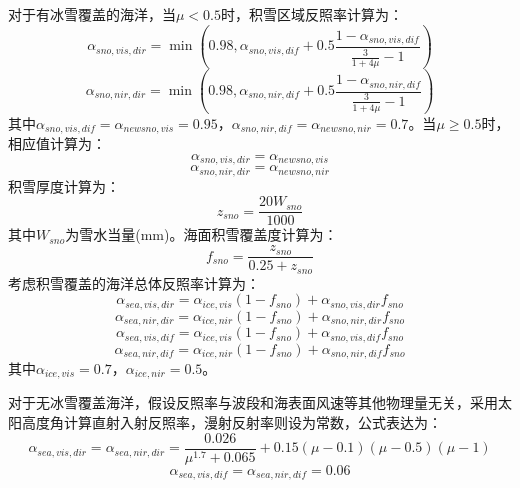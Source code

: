 对于有冰雪覆盖的海洋，当\(\mu < 0.5\)时，积雪区域反照率计算为：
%
\begin{equation}
\alpha_{sno,vis,dir} = \min\left( 0.98,\alpha_{sno,vis,dif} + 0.5\frac{1 - \alpha_{sno,vis,dif}}{\frac{3}{1 + 4\mu} - 1} \right)
\end{equation}
%
\begin{equation}
\alpha_{sno,nir,dir} = \min\left( 0.98,\alpha_{sno,nir,dif} + 0.5\frac{1 - \alpha_{sno,nir,dif}}{\frac{3}{1 + 4\mu} - 1} \right)
\end{equation}
%
其中\(\alpha_{sno,vis,dif} = \alpha_{newsno,vis} = 0.95\)，\(\alpha_{sno,nir,dif} = \alpha_{newsno,nir} = 0.7\)。当\(\mu \geqslant 0.5\)时，相应值计算为：
%
\begin{equation}
\alpha_{sno,vis,dir} = \alpha_{newsno,vis}
\end{equation}
%
\begin{equation}
\alpha_{sno,nir,dir} = \alpha_{newsno,nir}
\end{equation}
%
积雪厚度计算为：
%
\begin{equation}
z_{sno} = \frac{20W_{sno}}{1000}
\end{equation}
%
其中\(W_{sno}\)为雪水当量(mm)。海面积雪覆盖度计算为：
\begin{equation}
f_{sno} = \frac{z_{sno}}{0.25 + z_{sno}}
\end{equation}
考虑积雪覆盖的海洋总体反照率计算为：
\begin{equation}
\alpha_{sea,vis,dir} = \alpha_{ice,vis}\left( 1 - f_{sno} \right) + \alpha_{sno,vis,dir}f_{sno}
\end{equation}
%
\begin{equation}
\alpha_{sea,nir,dir} = \alpha_{ice,nir}\left( 1 - f_{sno} \right) + \alpha_{sno,nir,dir}f_{sno}
\end{equation}
%
\begin{equation}
\alpha_{sea,vis,dif} = \alpha_{ice,vis}\left( 1 - f_{sno} \right) + \alpha_{sno,vis,dif}f_{sno}
\end{equation}
%
\begin{equation}
\alpha_{sea,nir,dif} = \alpha_{ice,nir}\left( 1 - f_{sno} \right) + \alpha_{sno,nir,dif}f_{sno}
\end{equation}
其中\(\alpha_{ice,vis} = 0.7\)，\(\alpha_{ice,nir} = 0.5\)。

对于无冰雪覆盖海洋，假设反照率与波段和海表面风速等其他物理量无关，采用太阳高度角计算直射入射反照率，漫射反射率则设为常数，公式表达为：
\begin{equation}
\alpha_{sea,vis,dir}=\alpha_{sea,nir,dir} = \frac{0.026}{\mu^{1.7}+0.065}+0.15(\mu-0.1)(\mu-0.5)(\mu-1)
\end{equation}
%
\begin{equation}
\alpha_{sea,vis,dif}=\alpha_{sea,nir,dif} = 0.06
\end{equation}

